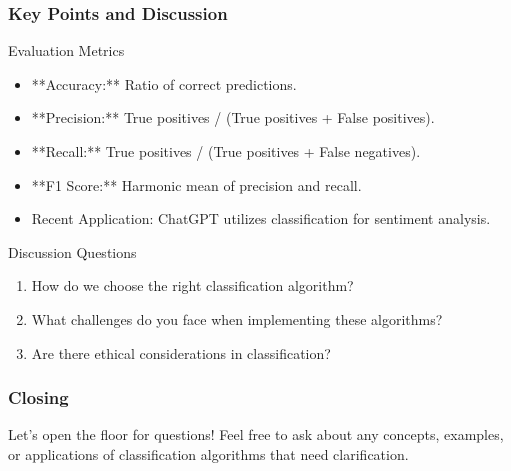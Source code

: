 \documentclass[aspectratio=169]{beamer}
\begin{document}
\begin{frame}[fragile]
  \frametitle{Key Points and Discussion}

  \begin{block}{Evaluation Metrics}
    \begin{itemize}
      \item **Accuracy:** Ratio of correct predictions.
      \item **Precision:** True positives / (True positives + False positives).
      \item **Recall:** True positives / (True positives + False negatives).
      \item **F1 Score:** Harmonic mean of precision and recall.
    \end{itemize}
  \end{block}  

  \begin{itemize}
    \item Recent Application: ChatGPT utilizes classification for sentiment analysis.
  \end{itemize}
  
  \begin{block}{Discussion Questions}
    \begin{enumerate}
      \item How do we choose the right classification algorithm?
      \item What challenges do you face when implementing these algorithms?
      \item Are there ethical considerations in classification?
    \end{enumerate}
  \end{block}
\end{frame}

\begin{frame}[fragile]
  \frametitle{Closing}
  Let's open the floor for questions! Feel free to ask about any concepts, examples, or applications of classification algorithms that need clarification.
\end{frame}
\end{document}
